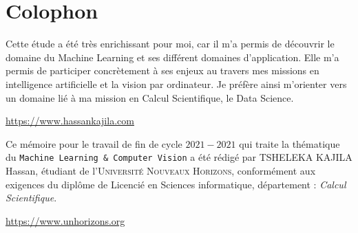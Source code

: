
\pagestyle{empty}

\hfill

\vfill


\section*{Colophon}
Cette étude a été très enrichissant pour moi, car il m'a permis de découvrir le domaine du Machine Learning et ses différent domaines d'application. Elle m'a permis de participer concrètement à ses enjeux au travers mes missions en intelligence artificielle et la vision par ordinateur. Je préfère ainsi m'orienter vers un domaine lié à ma mission en Calcul Scientifique, le Data Science.




\begin{center}
\url{https://www.hassankajila.com}
\end{center}
{Ce mémoire pour le travail de fin de cycle \textsf{$2021-2021$} qui traite la thématique du \texttt{Machine Learning \& Computer Vision} a été rédigé par {TSHELEKA KAJILA Hassan}, étudiant de l'\textsc{Université Nouveaux Horizons}, conformément aux exigences du diplôme de Licencié en Sciences informatique, département : \emph{Calcul Scientifique}.}


\begin{center}
\url{https://www.unhorizons.org}
\end{center}
 
\bigskip

\noindent\finalVersionString